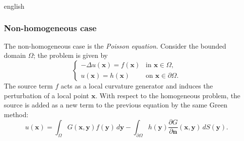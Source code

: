 \documentclass[12pt,letterpaper,twoside]{book}
\begin{document}
\begin{hyphenrules}{english}
\subsubsection{Non-homogeneous case}
The non-homogeneous case is the \emph{Poisson equation}. Consider the bounded domain $\Omega$; the
problem is given by
\begin{equation}
  \begin{cases}
    -\Delta u(\mathbf{x})=f(\mathbf{x}) & \text{in } \mathbf{x}\in\Omega,\\
    u(\mathbf{x})=h(\mathbf{x}) & \text{on } \mathbf{x}\in\partial\Omega.
  \end{cases}
  \label{eq:poisson}
\end{equation}
The source term $f$ acts as a local curvature generator and induces the perturbation of a local point
$\mathbf{x}$. With respect to the homogeneous problem, the source is added as a new term to the previous
equation by the same Green method:
\begin{equation}
  u(\mathbf{x})=\int_\Omega G(\mathbf{x},\mathbf{y})f(\mathbf{y})\,d\mathbf{y}-\int_{\partial\Omega}h(\mathbf{y})\frac{\partial G}{\partial\mathbf{n}}(\mathbf{x},\mathbf{y})\,d S(\mathbf{y}).
  \label{eq:poisson-green}
\end{equation}


\end{hyphenrules}
\end{document}
